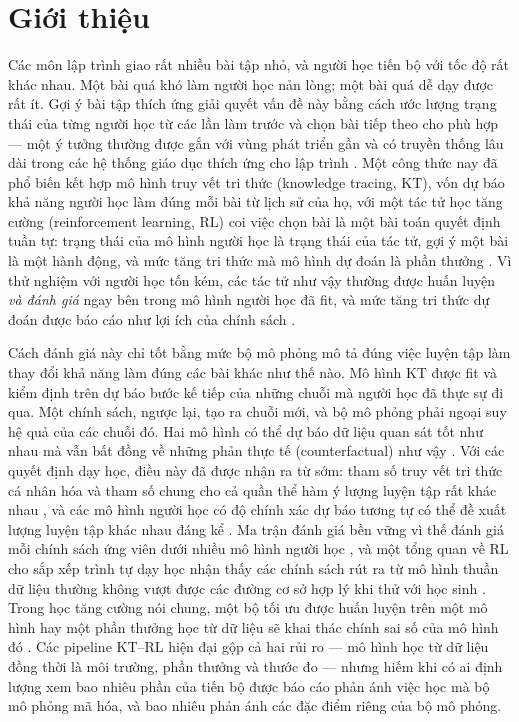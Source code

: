 \section{Giới thiệu}\label{sec:intro}

Các môn lập trình giao rất nhiều bài tập nhỏ, và người học tiến bộ với tốc độ rất khác nhau. Một bài quá khó làm người học nản lòng; một bài quá dễ dạy được rất ít. Gợi ý bài tập thích ứng giải quyết vấn đề này bằng cách ước lượng trạng thái của từng người học từ các lần làm trước và chọn bài tiếp theo cho phù hợp — một ý tưởng thường được gắn với vùng phát triển gần \citep{vygotsky1978mind} và có truyền thống lâu dài trong các hệ thống giáo dục thích ứng cho lập trình \citep{brusilovsky2007user,hsiao2010guiding}. Một công thức nay đã phổ biến kết hợp mô hình truy vết tri thức (knowledge tracing, KT), vốn dự báo khả năng người học làm đúng mỗi bài từ lịch sử của họ, với một tác tử học tăng cường (reinforcement learning, RL) coi việc chọn bài là một bài toán quyết định tuần tự: trạng thái của mô hình người học là trạng thái của tác tử, gợi ý một bài là một hành động, và mức tăng tri thức mà mô hình dự đoán là phần thưởng \citep{huang2019dre,liu2019cseal,ai2019cdkt,chen2023src,li2023gehrl,ozyurt2025exrec}. Vì thử nghiệm với người học tốn kém, các tác tử như vậy thường được huấn luyện \emph{và đánh giá} ngay bên trong mô hình người học đã fit, và mức tăng tri thức dự đoán được báo cáo như lợi ích của chính sách \citep{cheng2026unier}.

Cách đánh giá này chỉ tốt bằng mức bộ mô phỏng mô tả đúng việc luyện tập làm thay đổi khả năng làm đúng các bài khác như thế nào. Mô hình KT được fit và kiểm định trên dự báo bước kế tiếp của những chuỗi mà người học đã thực sự đi qua. Một chính sách, ngược lại, tạo ra chuỗi mới, và bộ mô phỏng phải ngoại suy hệ quả của các chuỗi đó. Hai mô hình có thể dự báo dữ liệu quan sát tốt như nhau mà vẫn bất đồng về những phản thực tế (counterfactual) như vậy \citep{breiman2001two,damour2022underspecification}. Với các quyết định dạy học, điều này đã được nhận ra từ sớm: tham số truy vết tri thức cá nhân hóa và tham số chung cho cả quần thể hàm ý lượng luyện tập rất khác nhau \citep{lee2012individualizing}, và các mô hình người học có độ chính xác dự báo tương tự có thể đề xuất lượng luyện tập khác nhau đáng kể \citep{rollinson2015predictive}. Ma trận đánh giá bền vững vì thế đánh giá mỗi chính sách ứng viên dưới nhiều mô hình người học \citep{doroudi2017rem}, và một tổng quan về RL cho sắp xếp trình tự dạy học nhận thấy các chính sách rút ra từ mô hình thuần dữ liệu thường không vượt được các đường cơ sở hợp lý khi thử với học sinh \citep{doroudi2019reward}. Trong học tăng cường nói chung, một bộ tối ưu được huấn luyện trên một mô hình hay một phần thưởng học từ dữ liệu sẽ khai thác chính sai số của mô hình đó \citep{kurutach2018metrpo,janner2019trust,gao2023scaling}. Các pipeline KT--RL hiện đại gộp cả hai rủi ro — mô hình học từ dữ liệu đồng thời là môi trường, phần thưởng và thước đo — nhưng hiếm khi có ai định lượng xem bao nhiêu phần của tiến bộ được báo cáo phản ánh việc học mà bộ mô phỏng mã hóa, và bao nhiêu phản ánh các đặc điểm riêng của bộ mô phỏng.

